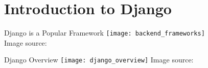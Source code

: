 \section{Introduction to Django}


\begin{frame}[c]{Django is a Popular Framework}
    \texttt{[image: backend\_frameworks]} \\
    Image source: \cite{frameworks}
\end{frame}


\begin{frame}{Django Overview}
    \texttt{[image: django\_overview]}
    Image source: \cite{overview}
\end{frame}



% 
% 

